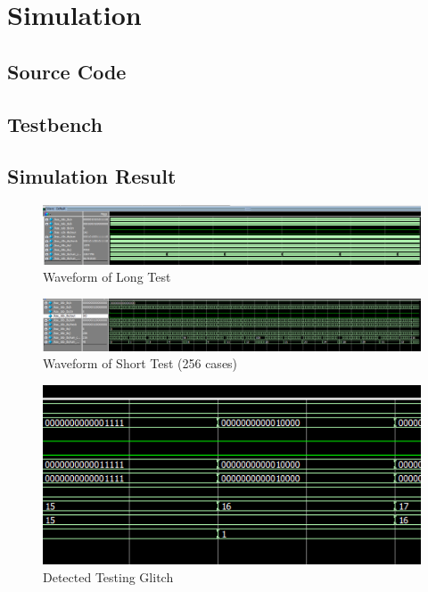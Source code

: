 \documentclass[a4paper]{report}
\begin{document}
    \chapter{Simulation}
        \section{Source Code}
            
        \section{Testbench}
            

        \section{Simulation Result}
            \begin{figure}[!htb]
                \centering
                \includegraphics[width=\textwidth]{diagrams/long_test_result.PNG}
                \caption {Waveform of Long Test}
                \label{fig:wf-1}
            \end{figure}

            \begin{figure}[!htb]
                \centering
                \includegraphics[width=\textwidth]{diagrams/short_test_result.PNG}
                \caption {Waveform of Short Test (256 cases)}
                \label{fig:wf-2}
            \end{figure}

            \begin{figure}[!htb]
                \centering
                \includegraphics[width=\textwidth]{diagrams/waveform_bug.PNG}
                \caption {Detected Testing Glitch}
                \label{fig:wf-3}
            \end{figure}
\end{document}
